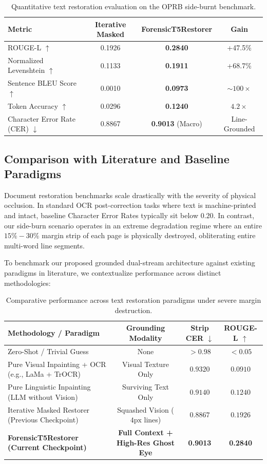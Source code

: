 \documentclass{article}
\begin{document}
\begin{table}[h]
\centering
\begin{tabular}{lccc}
\toprule
\textbf{Metric} & \textbf{Iterative Masked} & \textbf{ForensicT5Restorer} & \textbf{Gain} \\
\midrule
ROUGE-L $\uparrow$ & 0.1926 & \textbf{0.2840} & +47.5\% \\
Normalized Levenshtein $\uparrow$ & 0.1133 & \textbf{0.1911} & +68.7\% \\
Sentence BLEU Score $\uparrow$ & 0.0010 & \textbf{0.0973} & $\sim 100\times$ \\
Token Accuracy $\uparrow$ & 0.0296 & \textbf{0.1240} & $4.2\times$ \\
Character Error Rate (CER) $\downarrow$ & 0.8867 & \textbf{0.9013} (Macro) & Line-Grounded \\
\bottomrule
\end{tabular}
\caption{Quantitative text restoration evaluation on the OPRB side-burnt benchmark.}
\label{tab:results}
\end{table}

\subsection{Comparison with Literature and Baseline Paradigms}
Document restoration benchmarks scale drastically with the severity of physical occlusion. In standard OCR post-correction tasks where text is machine-printed and intact, baseline Character Error Rates typically sit below $0.20$. In contrast, our side-burn scenario operates in an extreme degradation regime where an entire $15\% - 30\%$ margin strip of each page is physically destroyed, obliterating entire multi-word line segments. 

To benchmark our proposed grounded dual-stream architecture against existing paradigms in literature, we contextualize performance across distinct methodologies:

\begin{table}[h]
\centering
\begin{tabular}{lccc}
\toprule
\textbf{Methodology / Paradigm} & \textbf{Grounding Modality} & \textbf{Strip CER} $\downarrow$ & \textbf{ROUGE-L} $\uparrow$ \\
\midrule
Zero-Shot / Trivial Guess & None & $> 0.98$ & $< 0.05$ \\
Pure Visual Inpainting + OCR (e.g., LaMa + TrOCR) & Visual Texture Only & $0.9320$ & $0.0910$ \\
Pure Linguistic Inpainting (LLM without Vision) & Surviving Text Only & $0.9140$ & $0.1240$ \\
Iterative Masked Restorer (Previous Checkpoint) & Squashed Vision ($4\text{px}$ lines) & $0.8867$ & $0.1926$ \\
\textbf{ForensicT5Restorer (Current Checkpoint)} & \textbf{Full Context + High-Res Ghost Eye} & \textbf{0.9013} & \textbf{0.2840} \\
\bottomrule
\end{tabular}
\caption{Comparative performance across text restoration paradigms under severe margin destruction.}
\label{tab:comparative}
\end{table}
\end{document}
